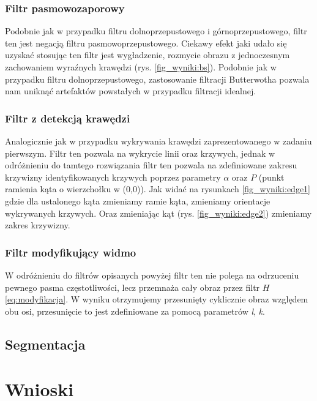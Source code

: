 \documentclass{classrep}
\begin{document}
\subsubsection{Filtr pasmowozaporowy}

Podobnie jak w przypadku filtru dolnoprzepustowego i górnoprzepustowego, filtr ten jest negacją filtru pasmowoprzepustowego. Ciekawy efekt jaki udało się uzyskać stosując ten filtr jest wygładzenie, rozmycie obrazu z jednoczesnym zachowaniem wyraźnych krawędzi (rys. \ref{fig_wyniki:bs}). Podobnie jak w przypadku filtru dolnoprzepustowego, zastosowanie filtracji Butterwotha pozwala nam uniknąć artefaktów powstałych w przypadku filtracji idealnej.

\subsubsection{Filtr z detekcją krawędzi}

Analogicznie jak w przypadku wykrywania krawędzi zaprezentowanego w zadaniu pierwszym. Filtr ten pozwala na wykrycie linii oraz krzywych, jednak w odróżnieniu do tamtego rozwiązania filtr ten pozwala na zdefiniowane zakresu krzywizny identyfikowanych krzywych poprzez parametry $\alpha$ oraz $P$ (punkt ramienia kąta o wierzchołku w (0,0)). Jak widać na rysunkach \ref{fig_wyniki:edge1} gdzie dla ustalonego kąta zmieniamy ramie kąta, zmieniamy orientacje wykrywanych krzywych. Oraz zmieniając kąt (rys. \ref{fig_wyniki:edge2}) zmieniamy zakres krzywizny.

\subsubsection{Filtr modyfikujący widmo}

W odróżnieniu do filtrów opisanych powyżej filtr ten nie polega na odrzuceniu pewnego pasma częstotliwości, lecz przemnaża cały obraz przez filtr $H$ \ref{eq:modyfikacja}. W wyniku otrzymujemy przesunięty cyklicznie obraz względem obu osi, przesunięcie to jest zdefiniowane za pomocą parametrów \emph{l}, \emph{k}.



\subsection{Segmentacja}




\section{Wnioski}
\end{document}
